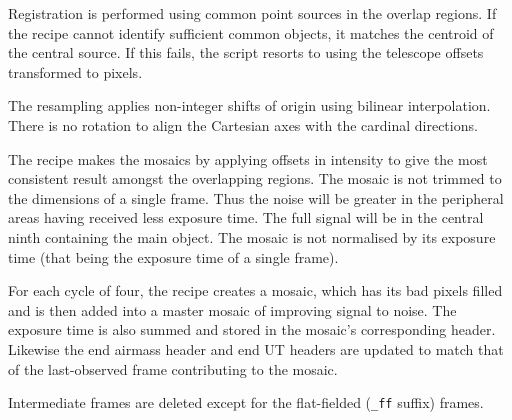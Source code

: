 \documentclass[twoside,11pt,nolof]{starlink}
\begin{document}
{{{         \sstitem
         Registration is performed using common point sources in the
         overlap regions.  If the recipe cannot identify sufficient common
         objects, it matches the centroid of the central source.  If this
         fails, the script resorts to using the telescope offsets
         transformed to pixels.

         \sstitem
         The resampling applies non-integer shifts of origin using
         bilinear interpolation.  There is no rotation to align the
         Cartesian axes with the cardinal directions.

         \sstitem
         The recipe makes the mosaics by applying offsets in intensity
         to give the most consistent result amongst the overlapping regions.
         The mosaic is not trimmed to the dimensions of a single frame.  Thus
         the noise will be greater in the peripheral areas having received
         less exposure time.  The full signal will be in the central ninth
         containing the main object.  The mosaic is not normalised by its
         exposure time (that being the exposure time of a single frame).

         \sstitem
         For each cycle of four, the recipe creates a mosaic, which has
         its bad pixels filled and is then added into a master mosaic of
         improving signal to noise.  The exposure time is also summed and
         stored in the mosaic's corresponding header.  Likewise the end
         airmass header and end UT headers are updated to match that of
         the last-observed frame contributing to the mosaic.

         \sstitem
         Intermediate frames are deleted except for the flat-fielded ({\tt\_ff}
         suffix) frames.
      }
   }
   }
\end{document}

